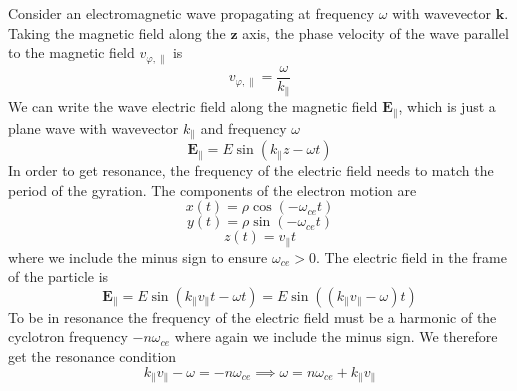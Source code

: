 Consider an electromagnetic wave propagating at frequency $\omega$ with wavevector $\bm{k}$. Taking the magnetic field along the $\bm{z}$ axis, the phase velocity of the wave parallel to the magnetic field $v_{\varphi,\parallel}$ is
\begin{equation}
	v_{\varphi,\parallel} = \frac{\omega}{k_{\parallel}}
\end{equation}
We can write the wave electric field along the magnetic field $\bm{E_{\parallel}}$, which is just a plane wave with wavevector $k_{\parallel}$ and frequency $\omega$
\begin{equation}
	\bm{E_{\parallel}} = E \sin \left( k_{\parallel}z - \omega t \right)
\end{equation}
In order to get resonance, the frequency of the electric field needs to match the period of the gyration. The components of the electron motion are
\begin{equation}
	x(t) = \rho \cos \left( -\omega_{ce} t \right)
\end{equation}
\begin{equation}
	y(t) = \rho \sin \left( -\omega_{ce} t \right)
\end{equation}
\begin{equation}
	z(t) = v_{\parallel} t
\end{equation}
where we include the minus sign to ensure $\omega_{ce} > 0$. The electric field in the frame of the particle is
\begin{equation}
	\bm{E_{\parallel}} = E \sin \left( k_{\parallel} v_{\parallel} t - \omega t \right) = E \sin \left( \left( k_{\parallel} v_{\parallel} - \omega \right) t \right)
\end{equation}
To be in resonance the frequency of the electric field must be a harmonic of the cyclotron frequency $-n \omega_{ce}$ where again we include the minus sign. We therefore get the resonance condition
\begin{equation}
	k_{\parallel} v_{\parallel} - \omega = -n \omega_{ce} \implies \omega = n \omega_{ce} + k_{\parallel} v_{\parallel}
\end{equation}

